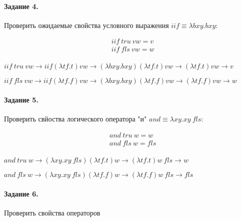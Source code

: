 \documentclass[a4paper,12pt]{article}
\begin{document}
\paragraph{Задание 4.} Проверить ожидаемые свойства условного выражения $iif \equiv \lambda b x y . b x y$:

\[
	\begin{split}
		&iif ~tru~ v w = v\\
		&iif ~fls~ v w = w\\
	\end{split}
\]

\begin{Solution}

$iif ~tru~ v w \rightarrow iif \left(\lambda tf . t\right) v w \rightarrow \left(\lambda b x y . b x y\right) \left(\lambda tf . t\right) v w \rightarrow \left(\lambda tf . t\right) v w \rightarrow v$

$iif ~fls~ v w \rightarrow iif \left(\lambda tf . f\right) v w \rightarrow \left(\lambda b x y . b x y\right) \left(\lambda tf . f\right) v w \rightarrow \left(\lambda tf . f\right) v w \rightarrow w$

\end{Solution}

\paragraph{Задание 5.} Проверить свйоства логического оператора "и" $and \equiv \lambda x y . x y ~fls$:

\[
	\begin{split}
		&and ~tru~ w = w\\
		&and ~fls~ w = fls\\
	\end{split}
\]

\begin{Solution}

$and ~tru~ w \rightarrow \left(\lambda x y . x y ~fls\right) \left(\lambda tf . t\right) w \rightarrow \left(\lambda tf . t\right) w ~fls \rightarrow w$

$and ~fls~ w \rightarrow \left(\lambda x y . x y ~fls\right)\left(\lambda tf . f\right) w \rightarrow \left(\lambda tf . f\right) w ~fls \rightarrow fls$

\end{Solution}

\paragraph{Задание 6.} Проверить свойства операторов
\end{document}
